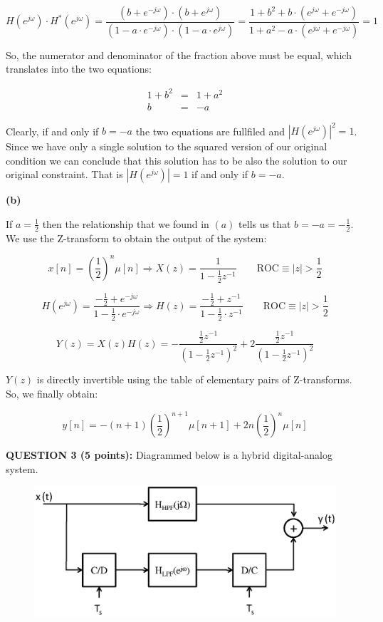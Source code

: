 \documentclass[a4paper,11pt,oneside]{article}
\begin{document}
\[
H(e^{j\omega})\cdot H^*(e^{j\omega})=\frac{(b+e^{-j\omega})\cdot (b+e^{j\omega})}{(1-a\cdot e^{-j\omega})\cdot(1-a\cdot e^{j\omega})}=\frac{1+b^2+b\cdot(e^{j\omega}+e^{-j\omega})}{1+a^2-a\cdot(e^{j\omega}+e^{-j\omega})}=1
\]

So, the numerator and denominator of the fraction above must be equal, which translates into the two equations:

\[
\begin{array}{lll}
1+b^2&=&1+a^2\\
b &=& -a
\end{array}
\]

Clearly, if and only if $b=-a$ the two equations are fullfiled and $|H(e^{j\omega})|^2=1$. Since we have only a single solution to the squared version of our original condition we can conclude that this solution has to be also the solution to our original constraint. That is $|H(e^{j\omega})|=1$ if and only if $b=-a$.

\textbf{(b)}

If $a=\frac{1}{2}$ then the relationship that we found in $(a)$ tells us that $b=-a=-\frac{1}{2}$. We use the Z-transform to obtain the output of the system:

\[
x[n] = \left(\frac{1}{2}\right)^n\mu[n] \Longrightarrow X(z)=\frac{1}{1-\frac{1}{2}z^{-1}} \qquad \textrm{ROC}\equiv |z|>\frac{1}{2} 
\]

\[
H(e^{j\omega})=\frac{-\frac{1}{2}+e^{-j\omega}}{1-\frac{1}{2}\cdot e^{-j\omega}}\Longrightarrow H(z)=\frac{-\frac{1}{2}+z^{-1}}{1-\frac{1}{2}\cdot z^{-1}} \qquad \textrm{ROC}\equiv |z|>\frac{1}{2}
\]

\[
Y(z)=X(z)H(z)=-\frac{\frac{1}{2}z^{-1}}{(1-\frac{1}{2}z^{-1})^2}+2\frac{\frac{1}{2}z^{-1}}{(1-\frac{1}{2}z^{-1})^2}
\]

$Y(z)$ is directly invertible using the table of elementary pairs of Z-transforms. So, we finally obtain:

\[
y[n]=-(n+1)\left(\frac{1}{2}\right)^{n+1}\mu[n+1]+2n\left(\frac{1}{2}\right)^n\mu[n]
\]




\vspace{1cm}

\textbf{QUESTION 3 (5 points):} Diagrammed below is a hybrid digital-analog system. 
\begin{figure}[h!]
\centering
\includegraphics[width=.8\textwidth]{fig31.eps}
\label{fig:fig2}
\end{figure}
\end{document}
